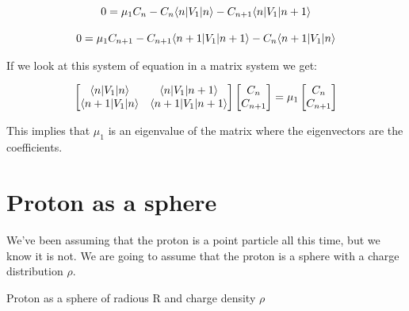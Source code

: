 \begin{equation}
\begin{array}{c}
  0 = \mu_1 C_n - C_n \langle n\rvert V_1\lvert n\rangle - C_{n+1} \langle n\rvert V_1\lvert n+1\rangle
  \\

  \\
  0 = \mu_1 C_{n+1} - C_{n+1} \langle n+1\rvert V_1\lvert n+1\rangle - C_n \langle n+1\rvert V_1\lvert n\rangle
\end{array}
\end{equation}

If we look at this system of equation in a matrix system we get:

\begin{equation}
  \begin{array}{c}
    \begin{bmatrix}
      \langle n\rvert V_1\lvert n\rangle & \langle n\rvert V_1\lvert n+1\rangle\\
      \langle n+1\rvert V_1\lvert n\rangle & \langle n+1\rvert V_1\lvert n+1\rangle
    \end{bmatrix}
    \begin{bmatrix}
      C_n\\
      C_{n+1}
    \end{bmatrix}
    = \mu_1
    \begin{bmatrix}
      C_n\\
      C_{n+1}
    \end{bmatrix}
  \end{array}
\end{equation}

This implies that $\mu_1$ is an eigenvalue of the matrix where the eigenvectors are the coefficients.

\section{Proton as a sphere}

We've been assuming that the proton is a point particle all this time, but we know it is not. We are going to assume that the proton is a sphere with a charge distribution $\rho$.

\begin{marginfigure}[-4cm]
  \label{figure_proton}
  \caption{Proton as a sphere of radious R and charge density $\rho$}
\end{marginfigure}

